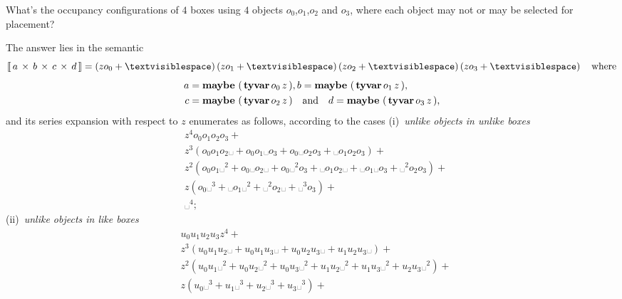 \begin{example}
What's the occupancy configurations of $4$ boxes using $4$ objects
$o_{0}$,$o_{1}$,$o_{2}$ and $o_{3}$, where each object may not or may be
selected for placement?

The answer lies in the semantic
\begin{displaymath}
    \semantic{\tycp{a}{\tycp{b}{\tycp{c}{d}}}} = \left(z o_{0} + ␣\right) \left(z o_{1} + ␣\right) \left(z o_{2} + ␣\right) \left(z o_{3} + ␣\right)
    \quad\text{where}
\end{displaymath}
\begin{displaymath}
\begin{split}
a&={\textbf{maybe}\,\left(\,\textbf{tyvar}\,o_{0}\,z\,\right)}, b={\textbf{maybe}\,\left(\,\textbf{tyvar}\,o_{1}\,z\,\right)},\\
c&={\textbf{maybe}\,\left(\,\textbf{tyvar}\,o_{2}\,z\,\right)}\quad\text{and}\quad d={\textbf{maybe}\,\left(\,\textbf{tyvar}\,o_{3}\,z\,\right)},
\end{split}
\end{displaymath}
and its series expansion with respect to $z$ enumerates as follows,
according to the cases (i)~\textit{unlike objects in unlike boxes}
\begin{displaymath}
\begin{split}
&z^{4} o_{0} o_{1} o_{2} o_{3} + \\
&z^{3} \left(o_{0} o_{1} o_{2} ␣ + o_{0} o_{1} ␣ o_{3} + o_{0} ␣ o_{2} o_{3} + ␣ o_{1} o_{2} o_{3}\right) +\\
&z^{2} \left(o_{0} o_{1} ␣^{2} + o_{0} ␣ o_{2} ␣ + o_{0} ␣^{2} o_{3} + ␣ o_{1} o_{2} ␣ + ␣ o_{1} ␣ o_{3} + ␣^{2} o_{2} o_{3}\right) + \\
&z \left(o_{0} ␣^{3} + ␣ o_{1} ␣^{2} + ␣^{2} o_{2} ␣ + ␣^{3} o_{3}\right) +\\
&␣^{4};
\end{split}
\end{displaymath}
(ii)~\textit{unlike objects in like boxes}
\begin{displaymath}
\begin{split}
&u_{0} u_{1} u_{2} u_{3} z^{4} + \\
&z^{3} \left(u_{0} u_{1} u_{2} ␣ + u_{0} u_{1} u_{3} ␣ + u_{0} u_{2} u_{3} ␣ + u_{1} u_{2} u_{3} ␣\right) + \\
&z^{2} \left(u_{0} u_{1} ␣^{2} + u_{0} u_{2} ␣^{2} + u_{0} u_{3} ␣^{2} + u_{1} u_{2} ␣^{2} + u_{1} u_{3} ␣^{2} + u_{2} u_{3} ␣^{2}\right) + \\
&z \left(u_{0} ␣^{3} + u_{1} ␣^{3} + u_{2} ␣^{3} + u_{3} ␣^{3}\right) +\\

\end{split}
\end{displaymath}
\end{example}
